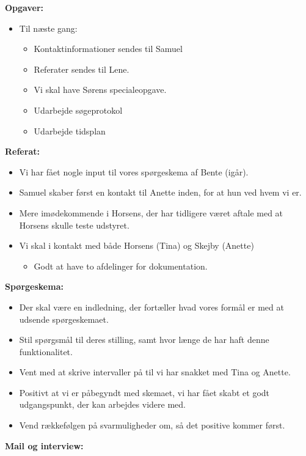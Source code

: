 \textbf{Opgaver:}
\begin{itemize}
\item Til næste gang: 
\begin{itemize}
\item Kontaktinformationer sendes til Samuel 
\item Referater sendes til Lene. 
\item Vi skal have Sørens specialeopgave. 
\item Udarbejde søgeprotokol
\item Udarbejde tidsplan
\end{itemize} 
\end{itemize} 
\textbf{Referat:}\\
\begin{itemize}
\item Vi har fået nogle input til vores spørgeskema af Bente (igår). 
\item Samuel skaber først en kontakt til Anette inden, for at hun ved hvem vi er.
\item Mere imødekommende i Horsens, der har tidligere været aftale med at Horsens skulle teste udstyret.
\item Vi skal i kontakt med både Horsens (Tina) og Skejby (Anette)
\begin{itemize}
\item Godt at have to afdelinger for dokumentation.
\end{itemize}
\end{itemize}
\textbf{Spørgeskema:}
\begin{itemize}
\item Der skal være en indledning, der fortæller hvad vores formål er med at udsende spørgeskemaet.
\item Stil spørgsmål til deres stilling, samt hvor længe de har haft denne funktionalitet.
\item Vent med at skrive intervaller på til vi har snakket med Tina og Anette.
\item Positivt at vi er påbegyndt med skemaet, vi har fået skabt et godt udgangspunkt, der kan arbejdes videre med.
\item Vend rækkefølgen på svarmuligheder om, så det positive kommer først.
\end{itemize}
\textbf{Mail og interview:}
